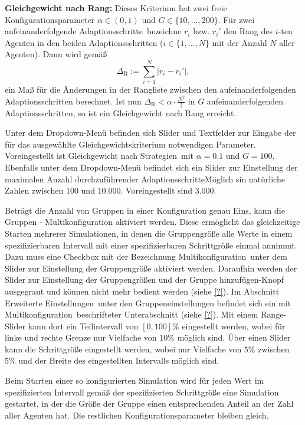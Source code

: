 \documentclass[parskip=full,11pt]{scrartcl}
\def\adapts{Adaptionsschritte}
\begin{document}
\textbf{Gleichgewicht nach Rang:}
Dieses Kriterium hat zwei freie Konfigurationsparameter \(\alpha \in (0,1)\) und \(G \in \{10,...,200\}\). Für zwei aufeinanderfolgende \adapts\ bezeichne \(r_i\) bzw. \(r_i'\) den Rang des \(i\)-ten Agenten in den beiden \adapts n (\(i \in \{1,...,N\}\) mit der Anzahl \(N\) aller Agenten). Dann wird gemäß
\[
\Delta_\text{R} := \sum_{i=1}^N |r_i - r_i'|,
\]
ein Maß für die Änderungen in der Rangliste zwischen den aufeinanderfolgenden \adapts n berechnet. Ist nun \(\Delta_\text{R} < \alpha \cdot \frac{N^2}{2}\) in \(G\) aufeinanderfolgenden \adapts n, so ist ein Gleichgewicht nach Rang erreicht.

Unter dem Dropdown-Menü befinden sich Slider und Textfelder zur Eingabe der für das ausgewählte Gleichgewichtskriterium notwendigen Parameter. Voreingestellt ist \glqq Gleichgewicht nach Strategien\grqq\ mit \(\alpha = 0.1\) und \(G = 100\). Ebenfalls unter dem Dropdown-Menü befindet sich ein Slider zur Einstellung der maximalen Anzahl durchzuführender \adapts\. Möglich sin natürliche Zahlen zwischen \(100\) und \(10.000\). Voreingestellt sind \(3.000\).

Beträgt die Anzahl von Gruppen in einer Konfiguration genau Eins, kann die Gruppen - Multikonfiguration aktiviert werden. Diese ermöglicht das gleichzeitige Starten mehrerer Simulationen, in denen die Gruppengröße alle Werte in einem spezifizierbaren Intervall mit einer spezifizierbaren Schrittgröße einmal annimmt. Dazu muss eine Checkbox mit der Bezeichnung \glqq Multikonfiguration\grqq\ unter dem Slider zur Einstellung der Gruppengröße aktiviert werden. Daraufhin werden der Slider zur Einstellung der Gruppengrößen und der \glqq Gruppe hinzufügen\grqq -Knopf ausgegraut und können nicht mehr bedient werden (siehe \cref{?}). Im Abschnitt \glqq Erweiterte Einstellungen\grqq\ unter den Gruppeneinstellungen befindet sich ein mit \glqq Multikonfiguration\grqq\ beschrifteter Unterabschnitt (siehe \cref{?}). Mit einem Range-Slider kann dort ein Teilintervall von \([0,100]\%\) eingestellt werden, wobei für linke und rechte Grenze nur Vielfache von \(10\%\) möglich sind. Über einen Slider kann die Schrittgröße eingestellt werden, wobei nur Vielfache von \(5\%\) zwischen \(5\%\) und der Breite des eingestellten Intervalls möglich sind.

Beim Starten einer so konfigurierten Simulation wird für jeden Wert im spezifizierten Intervall gemäß der spezifizierten Schrittgröße eine Simulation gestartet, in der die Größe der Gruppe einen entsprechenden Anteil an der Zahl aller Agenten hat. Die restlichen Konfigurationsparameter bleiben gleich.
\end{document}
